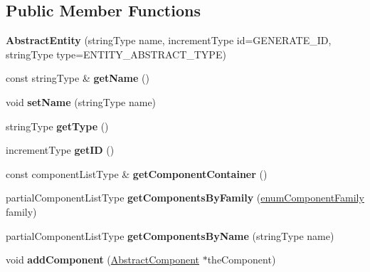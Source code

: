\subsection*{Public Member Functions}
\begin{DoxyCompactItemize}
\item 
\hypertarget{classAbstractEntity_a3add1bfe2ae3fff4f9cd90c037de4ca9}{{\bfseries Abstract\-Entity} (string\-Type name, increment\-Type id=G\-E\-N\-E\-R\-A\-T\-E\-\_\-\-I\-D, string\-Type type=E\-N\-T\-I\-T\-Y\-\_\-\-A\-B\-S\-T\-R\-A\-C\-T\-\_\-\-T\-Y\-P\-E)}\label{classAbstractEntity_a3add1bfe2ae3fff4f9cd90c037de4ca9}

\item 
\hypertarget{classAbstractEntity_aec817a49e43c43792109dfa9e8610b03}{const string\-Type \& {\bfseries get\-Name} ()}\label{classAbstractEntity_aec817a49e43c43792109dfa9e8610b03}

\item 
\hypertarget{classAbstractEntity_a8a066877508f8210e0465c8fd66776f2}{void {\bfseries set\-Name} (string\-Type name)}\label{classAbstractEntity_a8a066877508f8210e0465c8fd66776f2}

\item 
\hypertarget{classAbstractEntity_a15a6678a115730a44a0c2fb677e74266}{string\-Type {\bfseries get\-Type} ()}\label{classAbstractEntity_a15a6678a115730a44a0c2fb677e74266}

\item 
\hypertarget{classAbstractEntity_a920f12c4ec70fd940715f0b641ec157f}{increment\-Type {\bfseries get\-I\-D} ()}\label{classAbstractEntity_a920f12c4ec70fd940715f0b641ec157f}

\item 
\hypertarget{classAbstractEntity_a82df682bfdce4f0074b8f5cc9a83517d}{const component\-List\-Type \& {\bfseries get\-Component\-Container} ()}\label{classAbstractEntity_a82df682bfdce4f0074b8f5cc9a83517d}

\item 
\hypertarget{classAbstractEntity_a8cb2f485fec20d50b08f4e092cd3837c}{partial\-Component\-List\-Type {\bfseries get\-Components\-By\-Family} (\hyperlink{AbstractComponent_8hpp_a3be2c3a78b2355914f50f3966ac68542}{enum\-Component\-Family} family)}\label{classAbstractEntity_a8cb2f485fec20d50b08f4e092cd3837c}

\item 
\hypertarget{classAbstractEntity_a1213b1a36c69e574ca9ab40bf34905d4}{partial\-Component\-List\-Type {\bfseries get\-Components\-By\-Name} (string\-Type name)}\label{classAbstractEntity_a1213b1a36c69e574ca9ab40bf34905d4}

\item 
\hypertarget{classAbstractEntity_a2a66bd0dd398b1f2e5151463b6bb3308}{void {\bfseries add\-Component} (\hyperlink{classAbstractComponent}{Abstract\-Component} $\ast$the\-Component)}\label{classAbstractEntity_a2a66bd0dd398b1f2e5151463b6bb3308}

\end{DoxyCompactItemize}
